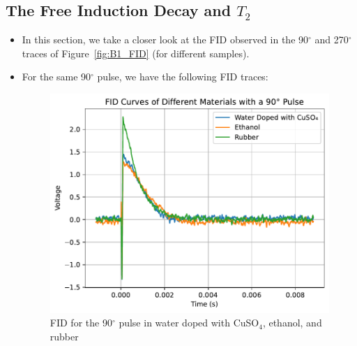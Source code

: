 \documentclass{article}
\newcommand{\degree}{$^{\circ}$ }
\begin{document}
\subsection{The Free Induction Decay and $T_2$}\label{subsec:the-free-induction-decay-and-$t_2$}
\begin{itemize}
    \item In this section, we take a closer look at the FID observed in the 90\degree and 270\degree traces of Figure~\ref{fig:B1_FID} (for different samples).
    \item For the same 90\degree pulse, we have the following FID traces:
    \begin{figure}[h]
        \centering
        \includegraphics[scale = 0.78]{../images/B2}
        \caption{FID for the 90$^{\circ}$ pulse in water doped with CuSO$_4$, ethanol, and rubber}
        \label{fig:B2_FID}
    \end{figure}
\end{itemize}
\end{document}
